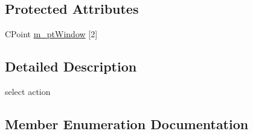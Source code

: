 \subsection*{Protected Attributes}
\begin{DoxyCompactItemize}
\item 
C\+Point \hyperlink{class_c_g3_d_action_select_a091eb4e40f0c6d6e2f0e70ed54c579ac}{m\+\_\+pt\+Window} \mbox{[}2\mbox{]}
\end{DoxyCompactItemize}


\subsection{Detailed Description}

\begin{DoxyItemize}
\item select action 
\end{DoxyItemize}

\subsection{Member Enumeration Documentation}
\hypertarget{class_c_g3_d_action_select_aab1b3255643c94752ce09839f17ebd9c}{}
